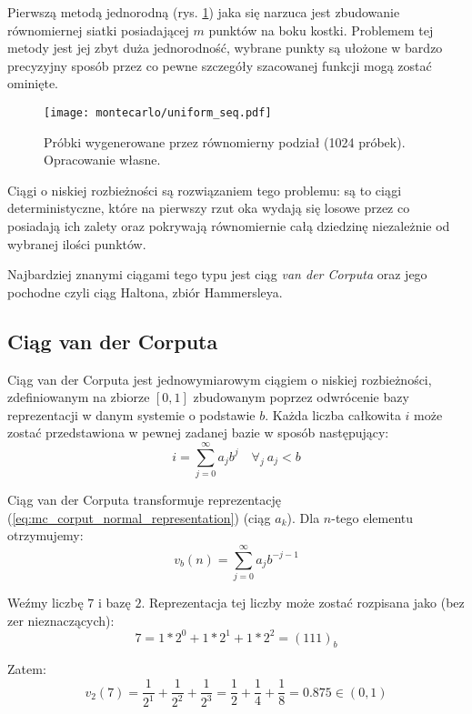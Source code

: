 \documentclass[../main.tex]{subfiles}
\begin{document}
Pierwszą metodą jednorodną (rys. \ref{fig:UniformSamples}) jaka się narzuca jest zbudowanie równomiernej siatki posiadającej $m$ punktów na boku kostki. Problemem tej metody jest jej zbyt duża jednorodność, wybrane punkty są ułożone w bardzo precyzyjny sposób przez co pewne szczegóły szacowanej funkcji mogą zostać ominięte.

\begin{figure}[h]
  \centering
  \texttt{[image: montecarlo/uniform\_seq.pdf]}
  \caption{Próbki wygenerowane przez równomierny podział (1024 próbek). Opracowanie własne.}
  \label{fig:UniformSamples}
\end{figure}

Ciągi o niskiej rozbieżności są rozwiązaniem tego problemu: są to ciągi deterministyczne, które na pierwszy rzut oka wydają się losowe przez co posiadają ich zalety oraz pokrywają równomiernie całą dziedzinę niezależnie od wybranej ilości punktów.

Najbardziej znanymi ciągami tego typu jest ciąg \textit{van der Corputa} oraz jego pochodne czyli ciąg Haltona, zbiór Hammersleya.

\subsection{Ciąg van der Corputa}

Ciąg van der Corputa \cite{WongSamplingWH} jest jednowymiarowym ciągiem o niskiej rozbieżności, zdefiniowanym na zbiorze $[0,1]$ zbudowanym poprzez odwrócenie bazy reprezentacji w danym systemie o podstawie $b$. Każda liczba całkowita $i$ może zostać przedstawiona w pewnej zadanej bazie w sposób następujący:
\begin{equation}
    i = \sum_{j=0}^{\infty} {a_j b^j} \quad \forall_{j}\: a_j < b
    \label{eq:mc_corput_normal_representation}
\end{equation}

Ciąg van der Corputa transformuje reprezentację (\ref{eq:mc_corput_normal_representation}) (ciąg $a_k$). Dla $n$-tego elementu otrzymujemy:
\begin{equation}
    v_b(n) = \sum_{j=0}^{\infty} {a_j b^{-j-1}} 
\end{equation}

\begin{example}
  Weźmy liczbę $7$ i bazę $2$. Reprezentacja tej liczby może zostać rozpisana jako (bez zer nieznaczących):
  \[ 
  7 = 1 * 2^0 + 1 * 2^1 + 1 * 2^2 = (111)_{b} 
  \]

  \noindent Zatem:
  \[
    v_{2}(7)
      = \frac{1}{2^{1}} + \frac{1}{2^{2}} + \frac{1}{2^{3}}
      = \frac{1}{2} + \frac{1}{4} + \frac{1}{8}
      = 0.875
      \in (0,1)
  \]
\end{example}
\end{document}
